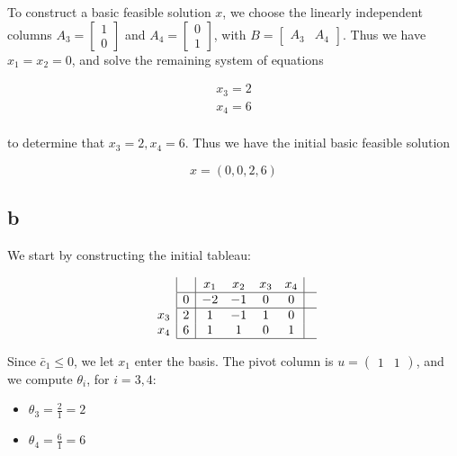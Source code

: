 \documentclass[11pt,a4paper]{article}
\begin{document}
To construct a basic feasible solution $x$, we choose the linearly independent columns $A_3=\begin{bmatrix}1\\0\end{bmatrix}$ and $A_4=\begin{bmatrix}0\\1\end{bmatrix}$, with $B=\begin{bmatrix}A_3 & A_4\end{bmatrix}$. Thus we have $x_1=x_2=0$, and solve the remaining system of equations

$$
\begin{array}{c}
x_3=2\\
x_4=6\\
\end{array}
$$

to determine that $x_3=2, x_4=6$. Thus we have the initial basic feasible solution

$$
x=(0,0,2,6)
$$

\subsection*{b}

We start by constructing the initial tableau:

$$
\begin{array}{c}
\\
 \\
x_3 \\
x_4 \\ 
\end{array}
\begin{array}{|c|cccc|c}
    & x_1 & x_2 & x_3 & x_4 &  \\ \hline
  0 & -2 & -1 & 0 & 0 & \\ \hline
  2 & 1 & -1 & 1 & 0 & \\
  6 & 1 & 1 & 0 & 1 & \\\hline
\end{array}
$$

Since $\bar{c}_1\leq 0$, we let $x_1$ enter the basis. The pivot column is $u=\begin{pmatrix}1 & 1\end{pmatrix}$, and we compute $\theta_i$, for $i=3,4$:

\begin{itemize}
\item $\theta_3=\frac{2}{1}=2$
\item $\theta_4=\frac{6}{1}=6$
\end{itemize}
\end{document}
